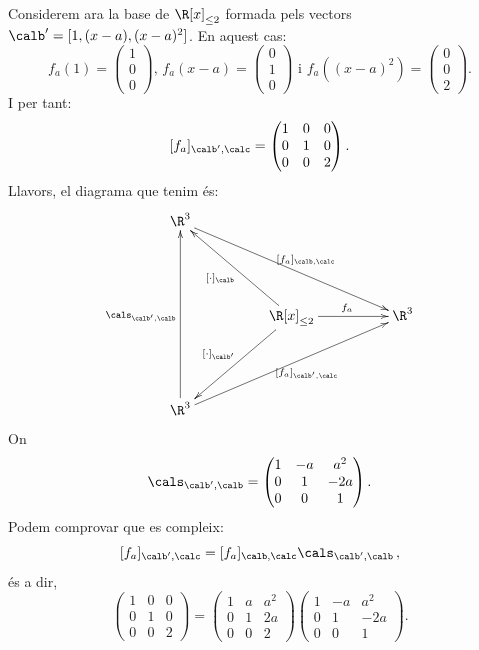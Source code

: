 \begin{exemple}
Considerem ara la base de $\R[x]_{\leq2}$ formada pels vectors $\calb'=[1,(x-a),(x-a)^2]$. En aquest cas:
$$
f_a(1)=\begin{pmatrix} 1 \\ 0 \\ 0 \end{pmatrix}
\text{, }
f_a(x-a)=\begin{pmatrix} 0 \\ 1 \\ 0 \end{pmatrix}
\text{ i }
f_a((x-a)^2)=\begin{pmatrix} 0 \\ 0 \\ 2 \end{pmatrix}.
$$
I per tant:
$$
[f_a]_{\calb',\calc}=\begin{pmatrix} 1 & 0 & 0 \\ 0 & 1 & 0 \\ 0 & 0 & 2\end{pmatrix}.
$$
Llavors, el diagrama que tenim és:
$$
\xymatrix@C50pt@R50pt{
\R^3 \ar[rrd]^{[f_a]_{\calb,\calc}} &  & \\
 & \R[x]_{\leq2} \ar[ul]^{[\cdot]_\calb} \ar[r]^{f_a} \ar[dl]_{[\cdot]_{\calb'}} & \R^3 \\
\R^3 \ar[rru]_{[f_a]_{\calb',\calc}} \ar[uu]^{\cals_{\calb',\calb}} & &
}
$$
On 
$$
\cals_{\calb',\calb}=\begin{pmatrix} 1 & -a & a^2 \\ 0 & 1 & -2a \\ 0 & 0 & 1\end{pmatrix}.
$$
Podem comprovar que es compleix:
$$
[f_a]_{\calb',\calc}=[f_a]_{\calb,\calc} \cals_{\calb',\calb} \,,
$$
és a dir,
\[
\begin{pmatrix} 1 & 0 & 0 \\ 0 & 1 & 0 \\ 0 & 0 & 2\end{pmatrix} = \begin{pmatrix} 1 & a & a^2 \\ 0 & 1 & 2a \\ 0 & 0 & 2\end{pmatrix} \begin{pmatrix} 1 & -a & a^2 \\ 0 & 1 & -2a \\ 0 & 0 & 1\end{pmatrix}.
\]
\end{exemple}

